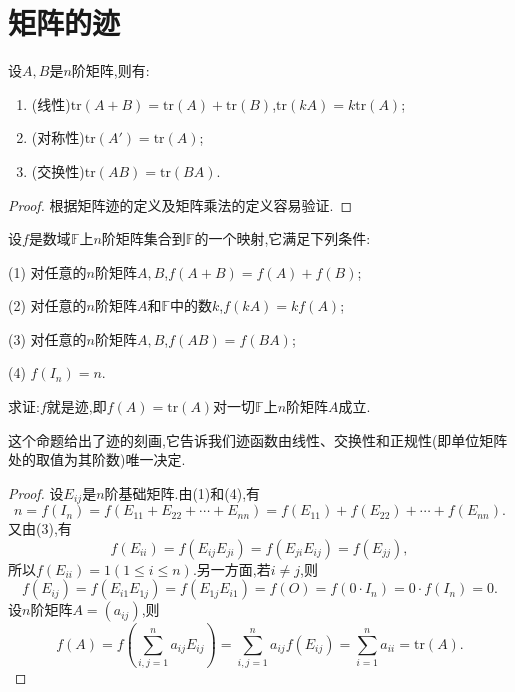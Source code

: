\documentclass[../../main.tex]{subfiles}
\begin{document}
\section{矩阵的迹}

\begin{proposition}[矩阵迹的性质]\label{proposition:矩阵矩阵迹的性质}
设\(A,B\)是\(n\)阶矩阵,则有:
\begin{enumerate}
\item (线性)\(\mathrm{tr}(A + B)=\mathrm{tr}(A)+\mathrm{tr}(B)\),\(\mathrm{tr}(kA)=k\mathrm{tr}(A)\);
\item (对称性)\(\mathrm{tr}(A')=\mathrm{tr}(A)\);
\item (交换性)\(\mathrm{tr}(AB)=\mathrm{tr}(BA)\).
\end{enumerate}
\end{proposition}
\begin{proof}
根据矩阵迹的定义及矩阵乘法的定义容易验证.
\end{proof}

\begin{proposition}[矩阵迹的刻画]\label{proposition:矩阵迹的刻画}
设\(f\)是数域\(\mathbb{F}\)上\(n\)阶矩阵集合到\(\mathbb{F}\)的一个映射,它满足下列条件:

(1) 对任意的\(n\)阶矩阵\(A,B\),\(f(A + B)=f(A)+f(B)\);

(2) 对任意的\(n\)阶矩阵\(A\)和\(\mathbb{F}\)中的数\(k\),\(f(kA)=kf(A)\);

(3) 对任意的\(n\)阶矩阵\(A,B\),\(f(AB)=f(BA)\);

(4) \(f(I_n)=n\).

求证:\(f\)就是迹,即\(f(A)=\mathrm{tr}(A)\)对一切\(\mathbb{F}\)上\(n\)阶矩阵\(A\)成立.
\end{proposition}
\begin{note}
这个命题给出了迹的刻画,它告诉我们迹函数由线性、交换性和正规性(即单位矩阵处的取值为其阶数)唯一决定.
\end{note}
\begin{proof}
设\(E_{ij}\)是\(n\)阶基础矩阵.由(1)和(4),有
\[
n = f(I_n)=f(E_{11}+E_{22}+\cdots+E_{nn})=f(E_{11})+f(E_{22})+\cdots+f(E_{nn}).
\]
又由(3),有
\[
f(E_{ii})=f(E_{ij}E_{ji})=f(E_{ji}E_{ij})=f(E_{jj}),
\]
所以\(f(E_{ii}) = 1(1\leqslant  i\leqslant  n)\).另一方面,若\(i\neq j\),则
\[
f(E_{ij})=f(E_{i1}E_{1j})=f(E_{1j}E_{i1})=f(O)=f(0\cdot I_n)=0\cdot f(I_n)=0.
\]
设\(n\)阶矩阵\(A=(a_{ij})\),则
\[
f(A)=f\left(\sum_{i,j = 1}^{n}a_{ij}E_{ij}\right)=\sum_{i,j = 1}^{n}a_{ij}f(E_{ij})=\sum_{i = 1}^{n}a_{ii}=\mathrm{tr}(A).
\]
\end{proof}
\end{document}
